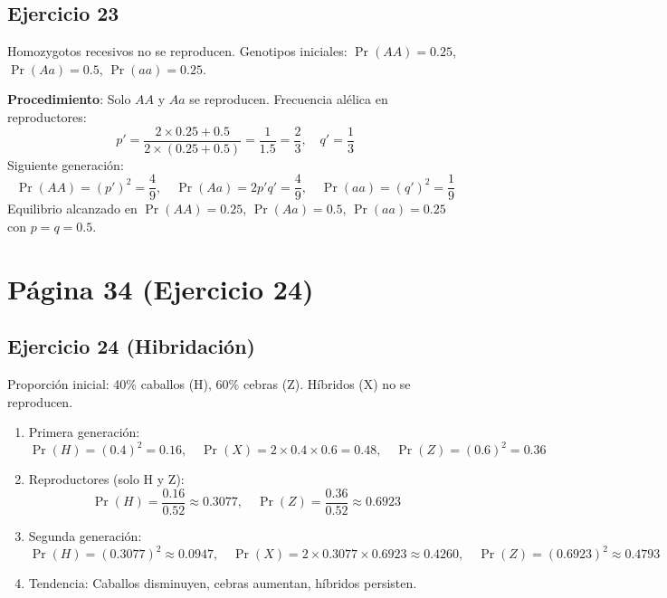\documentclass{article}
\begin{document}
	\subsection*{Ejercicio 23}
	Homozygotos recesivos no se reproducen. Genotipos iniciales: \( \Pr(AA) = 0.25 \), \( \Pr(Aa) = 0.5 \), \( \Pr(aa) = 0.25 \).
	
	\textbf{Procedimiento}: Solo \( AA \) y \( Aa \) se reproducen. Frecuencia alélica en reproductores:
	\[
	p' = \frac{2 \times 0.25 + 0.5}{2 \times (0.25 + 0.5)} = \frac{1}{1.5} = \frac{2}{3}, \quad q' = \frac{1}{3}
	\]
	Siguiente generación:
	\[
	\Pr(AA) = (p')^2 = \frac{4}{9}, \quad \Pr(Aa) = 2p'q' = \frac{4}{9}, \quad \Pr(aa) = (q')^2 = \frac{1}{9}
	\]
	Equilibrio alcanzado en \( \Pr(AA) = 0.25 \), \( \Pr(Aa) = 0.5 \), \( \Pr(aa) = 0.25 \) con \( p = q = 0.5 \).
	
	\section*{Página 34 (Ejercicio 24)}
	
	\subsection*{Ejercicio 24 (Hibridación)}
	Proporción inicial: 40\% caballos (H), 60\% cebras (Z). Híbridos (X) no se reproducen.
	\begin{enumerate}[label=\alph*)]
		\item Primera generación:
		\[
		\Pr(H) = (0.4)^2 = 0.16, \quad \Pr(X) = 2 \times 0.4 \times 0.6 = 0.48, \quad \Pr(Z) = (0.6)^2 = 0.36
		\]
		
		\item Reproductores (solo H y Z):
		\[
		\Pr(H) = \frac{0.16}{0.52} \approx 0.3077, \quad \Pr(Z) = \frac{0.36}{0.52} \approx 0.6923
		\]
		
		\item Segunda generación:
		\[
		\Pr(H) = (0.3077)^2 \approx 0.0947, \quad \Pr(X) = 2 \times 0.3077 \times 0.6923 \approx 0.4260, \quad \Pr(Z) = (0.6923)^2 \approx 0.4793
		\]
		
		\item Tendencia: Caballos disminuyen, cebras aumentan, híbridos persisten.
	\end{enumerate}
	
\end{document}
